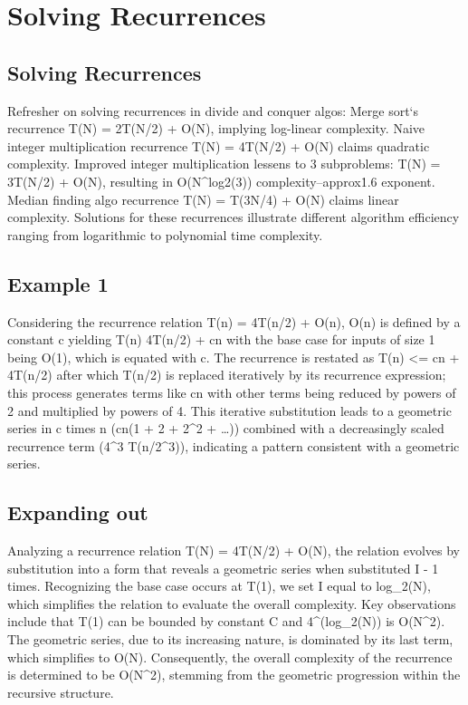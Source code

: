 \section*{Solving Recurrences}

\subsection*{Solving Recurrences}
Refresher on solving recurrences in divide and conquer algos: Merge sort`s recurrence T(N) = 2T(N/2) + O(N), implying log-linear complexity.
Naive integer multiplication recurrence T(N) = 4T(N/2) + O(N) claims quadratic complexity.
Improved integer multiplication lessens to 3 subproblems: T(N) = 3T(N/2) + O(N), resulting in O(N\textasciicircum{}log2(3)) complexity--approx\. 1.6 exponent.
Median finding algo recurrence T(N) = T(3N/4) + O(N) claims linear complexity.
Solutions for these recurrences illustrate different algorithm efficiency ranging from logarithmic to polynomial time complexity.

\subsection*{Example 1}
Considering the recurrence relation T(n) = 4T(n/2) + O(n), O(n) is defined by a constant c yielding T(n)  4T(n/2) + cn with the base case for inputs of size 1 being O(1), which is equated with c.
The recurrence is restated as T(n) \textless{}= cn + 4T(n/2) after which T(n/2) is replaced iteratively by its recurrence expression; this process generates terms like cn with other terms being reduced by powers of 2 and multiplied by powers of 4.
This iterative substitution leads to a geometric series in c times n (cn(1 + 2 + 2\textasciicircum{}2 + \ldots)) combined with a decreasingly scaled recurrence term (4\textasciicircum{}3 T(n/2\textasciicircum{}3)), indicating a pattern consistent with a geometric series.

\subsection*{Expanding out}
Analyzing a recurrence relation T(N) = 4T(N/2) + O(N), the relation evolves by substitution into a form that reveals a geometric series when substituted I - 1 times.
Recognizing the base case occurs at T(1), we set I equal to log\_2(N), which simplifies the relation to evaluate the overall complexity.
Key observations include that T(1) can be bounded by constant C and 4\textasciicircum{}(log\_2(N)) is O(N\textasciicircum{}2).
The geometric series, due to its increasing nature, is dominated by its last term, which simplifies to O(N).
Consequently, the overall complexity of the recurrence is determined to be O(N\textasciicircum{}2), stemming from the geometric progression within the recursive structure.

